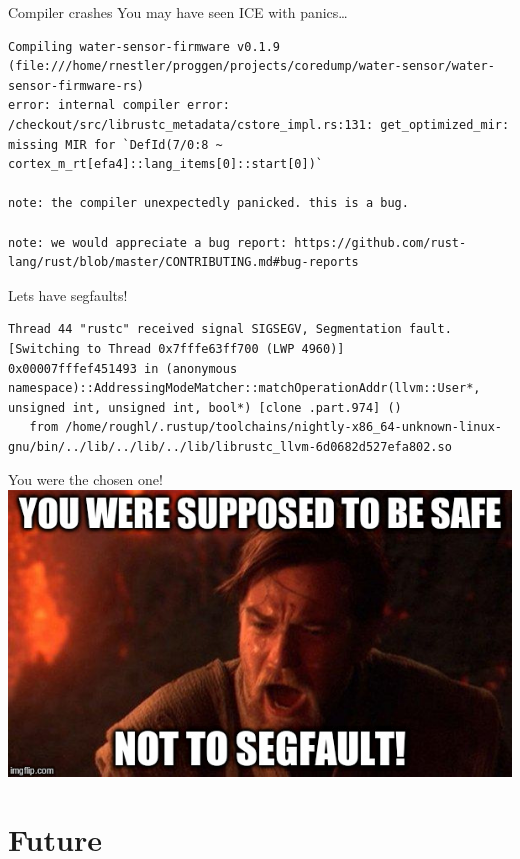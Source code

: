 \documentclass[aspectratio=1610,14pt,t]{beamer}
\begin{document}
\begin{frame}[c,fragile]{Compiler crashes}
  You may have seen ICE with panics\ldots

  \begin{verbatim}
Compiling water-sensor-firmware v0.1.9 (file:///home/rnestler/proggen/projects/coredump/water-sensor/water-sensor-firmware-rs)
error: internal compiler error: /checkout/src/librustc_metadata/cstore_impl.rs:131: get_optimized_mir: missing MIR for `DefId(7/0:8 ~ cortex_m_rt[efa4]::lang_items[0]::start[0])`

note: the compiler unexpectedly panicked. this is a bug.

note: we would appreciate a bug report: https://github.com/rust-lang/rust/blob/master/CONTRIBUTING.md#bug-reports
  \end{verbatim}
\end{frame}

\begin{frame}[c,fragile]{Lets have segfaults!}
  \begin{verbatim}
Thread 44 "rustc" received signal SIGSEGV, Segmentation fault.
[Switching to Thread 0x7fffe63ff700 (LWP 4960)]
0x00007fffef451493 in (anonymous namespace)::AddressingModeMatcher::matchOperationAddr(llvm::User*, unsigned int, unsigned int, bool*) [clone .part.974] ()
   from /home/roughl/.rustup/toolchains/nightly-x86_64-unknown-linux-gnu/bin/../lib/../lib/../lib/librustc_llvm-6d0682d527efa802.so
  \end{verbatim}
\end{frame}

\begin{frame}[c]{You were the chosen one!}
  \centering
  \includegraphics[width=.8\textwidth]{img/not-so-safe-rust.jpg}
\end{frame}

\section{Future}
\end{document}
